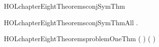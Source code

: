 \newcommand{\HOLchapterEightDate}{19 August 2019}
\newcommand{\HOLchapterEightTime}{21:11}
\begin{SaveVerbatim}{HOLchapterEightTheoremsconjSymThm}
\HOLTokenTurnstile{}  \HOLSymConst{\HOLTokenConj{}}  \HOLSymConst{\HOLTokenEquiv{}}  \HOLSymConst{\HOLTokenConj{}} 
\end{SaveVerbatim}
\newcommand{\HOLchapterEightTheoremsconjSymThm}{\UseVerbatim{HOLchapterEightTheoremsconjSymThm}}
\begin{SaveVerbatim}{HOLchapterEightTheoremsconjSymThmAll}
\HOLTokenTurnstile{} \HOLSymConst{\HOLTokenForall{}} .  \HOLSymConst{\HOLTokenConj{}}  \HOLSymConst{\HOLTokenEquiv{}}  \HOLSymConst{\HOLTokenConj{}} 
\end{SaveVerbatim}
\newcommand{\HOLchapterEightTheoremsconjSymThmAll}{\UseVerbatim{HOLchapterEightTheoremsconjSymThmAll}}
\begin{SaveVerbatim}{HOLchapterEightTheoremsproblemOneThm}
\HOLTokenTurnstile{}  \HOLSymConst{\HOLTokenImp{}} ( \HOLSymConst{\HOLTokenImp{}} ) \HOLSymConst{\HOLTokenImp{}} ( \HOLSymConst{\HOLTokenImp{}} ) \HOLSymConst{\HOLTokenImp{}} 
\end{SaveVerbatim}
\newcommand{\HOLchapterEightTheoremsproblemOneThm}{\UseVerbatim{HOLchapterEightTheoremsproblemOneThm}}
\newcommand{\HOLchapterEightTheorems}{
\HOLThmTag{chapter8}{conjSymThm}\HOLchapterEightTheoremsconjSymThm
\HOLThmTag{chapter8}{conjSymThmAll}\HOLchapterEightTheoremsconjSymThmAll
\HOLThmTag{chapter8}{problem1Thm}\HOLchapterEightTheoremsproblemOneThm
}
